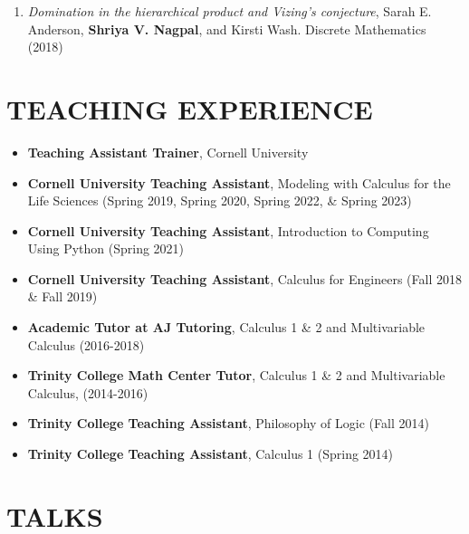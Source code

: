 \documentclass[margin]{res} %
\begin{document}
\begin{resume}
\begin{enumerate}
    \item {\sl Domination in the hierarchical product and Vizing’s conjecture}, Sarah E. Anderson, \textbf{Shriya V. Nagpal}, and Kirsti Wash. Discrete Mathematics (2018)
\end{enumerate}


\section{TEACHING EXPERIENCE}

\begin{itemize}
    \item \textbf{Teaching Assistant Trainer}, Cornell University
    \item \textbf{Cornell University Teaching Assistant}, Modeling with Calculus for the Life Sciences (Spring 2019, Spring 2020, Spring 2022, \&  Spring 2023)
    \item \textbf{Cornell University Teaching Assistant}, Introduction to Computing Using Python (Spring 2021)
    \item \textbf{Cornell University Teaching Assistant}, Calculus for Engineers (Fall 2018 \& Fall 2019) 
    \item \textbf{Academic Tutor at AJ Tutoring}, Calculus 1 \& 2 and Multivariable Calculus (2016-2018)
    \item \textbf{Trinity College Math Center Tutor}, Calculus 1 \& 2 and Multivariable Calculus, (2014-2016)
    \item \textbf{Trinity College Teaching Assistant}, Philosophy of Logic (Fall 2014)
    \item \textbf{Trinity College Teaching Assistant}, Calculus 1 (Spring 2014)
\end{itemize}



\section{TALKS}

\end{resume}
\end{document}
